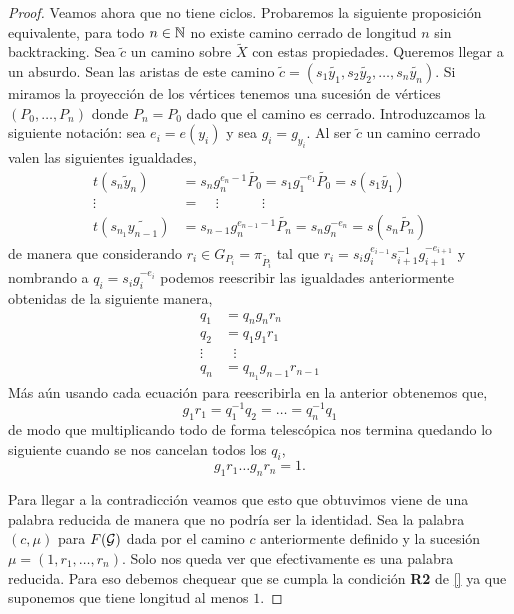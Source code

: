 \documentclass[tesis.tex]{subfiles}
\begin{document}
\begin{proof}
	Veamos ahora que no tiene ciclos.
	Probaremos la siguiente proposición equivalente, para todo $n \in \mathbb{N}$ no existe camino cerrado de longitud $n$ sin backtracking.
	Sea $\tilde c$ un camino sobre $\tilde X$ con estas propiedades. 
	Queremos llegar a un absurdo.
	Sean las aristas de este camino $\tilde c = (s_1\tilde{y_1}, s_2 \tilde{y_2}, \dots, s_n \tilde{ y_n})$.
	Si miramos la proyección de los vértices tenemos una sucesión de vértices $(P_0, \dots, P_n)$ donde $P_n = P_0$ dado que el camino es cerrado.
	Introduzcamos la siguiente notación: sea $e_i = e(y_i)$ y sea $g_i = g_{y_i}$.
	Al ser $\tilde c$ un camino cerrado valen las siguientes igualdades,
	\begin{align*}
		t(s_n\tilde y_n) &= s_ng_n^{e_n - 1}\tilde{P_0} = s_1g_1^{-e_1} \tilde{P_0} = s(s_1\tilde{ y_1}) \\ 
		\vdots \ \ \  &= \ \ \ \ \    \vdots\ \ \ \ \ \ \ \ \ \ \ \ \ \    \vdots \\
		t(s_{n_1}\widetilde{ y_{n-1}}) &= s_{n-1}g_n^{e_{n-1} - 1}\tilde{P_n} = s_ng_n^{-e_n} = s(s_n\tilde{P_n} )  
	\end{align*}
	de manera que considerando $r_i \in G_{P_i} = \pi_{\tilde{ P_i}}$ tal que $r_i = s_ig_i^{e_{i-1}} s_{i+1}^{-1} g_{i+1}^{-e_{i+1}}$ y nombrando a $q_i = s_ig_i^{-e_i}$ 
	podemos reescribir las igualdades anteriormente obtenidas de la siguiente manera,
	\begin{align*}
		q_1 &= q_ng_nr_n \\
		q_2 &= q_1g_1r_1 \\
		\vdots & \ \ \ \vdots \\
		q_n &= q_{n_1}g_{n-1}r_{n-1} 
	\end{align*}
	Más aún usando cada ecuación para reescribirla en la anterior obtenemos que,
	\begin{equation*}
		g_1r_1 = q_1^{-1} q_2 = \dots = q_n^{-1}q_1
	\end{equation*}
	de modo que multiplicando todo de forma telescópica nos termina quedando lo siguiente cuando se nos cancelan todos los $q_i$,
	\begin{equation*}
		g_1r_1\dots g_nr_n = 1.
	\end{equation*} 
	
	Para llegar a la contradicción veamos que esto que obtuvimos viene de una palabra reducida de manera que no podría ser la identidad.
	Sea la palabra $(c, \mu)$ para $F({\cal G})$ dada por el camino $c$ anteriormente definido y la sucesión $\mu = (1,r_1, \dots, r_n)$.
	Solo nos queda ver que efectivamente es una palabra reducida. 
	Para eso debemos chequear que se cumpla la condición \textbf{R2} de \ref{} ya que suponemos que tiene longitud al menos $1$.
	

\end{proof}
\end{document}
